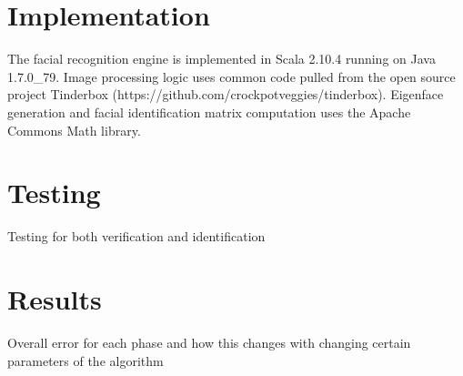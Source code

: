 \documentclass[11pt]{article}
\begin{document}
\section*{Implementation}

The facial recognition engine is implemented in Scala 2.10.4 running on Java 1.7.0\_79. Image processing logic uses common code pulled from the open source project Tinderbox (https://github.com/crockpotveggies/tinderbox). Eigenface generation and facial identification matrix computation uses the Apache Commons Math library.

\section*{Testing}
Testing for both verification and identification


\section*{Results}

Overall error for each phase and how this changes with changing certain parameters of the algorithm
\end{document}
